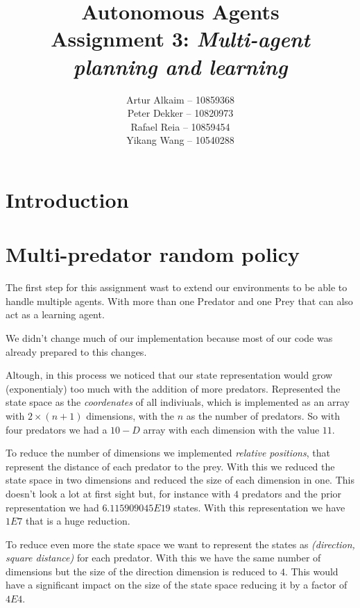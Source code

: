\documentclass{article}
\begin{document}
\title{Autonomous Agents\\
Assignment 3: \emph{Multi-agent planning and learning}}
\author{
Artur Alkaim -- 10859368\\
Peter Dekker -- 10820973\\
Rafael Reia -- 10859454\\
Yikang Wang -- 10540288\\
}
\maketitle
\section{Introduction}

\section{Multi-predator random policy}
The first step for this assignment wast to extend our environments to be able to
handle multiple agents. With more than one Predator and one Prey that can also
act as a learning agent.

We didn't change much of our implementation because most of our code was
already prepared to this changes.

Altough, in this process we noticed that our state representation would grow
(exponentialy) too much with the addition of more predators. Represented the
state space as the \emph{coordenates} of all indiviuals, which is implemented as
an array with $2 \times (n+1)$ dimensions, with the $n$ as the number of predators. So with four predators we had a $10-D$ array with each
dimension with the value $11$. 

To reduce the number of dimensions we implemented \emph{relative positions},
that represent the distance of each predator to the prey. With this we reduced the
state space in two dimensions and reduced the size of each dimension in one.
This doesn't look a lot at first sight but, for instance with $4$ predators and
the prior representation we had $6.115909045E19$ states. With this
representation we have $1E7$ that is a huge reduction.

To reduce even more the state space we want to represent the states as
\emph{(direction, square distance)} for each predator. With this we have the
same number of dimensions but the size of the direction dimension is reduced to $4$.
This would have a significant impact on the size of the state space reducing it
by a factor of $4E4$.
\end{document}
